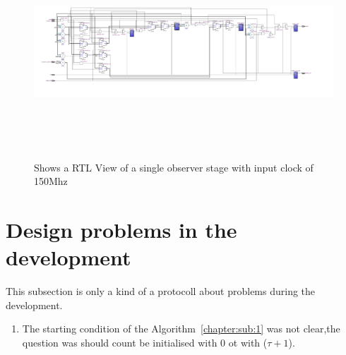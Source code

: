 \begin{figure}[]
\centering
\includegraphics[width=650px,height=300px,angle=-90]{../../pictures/22.02.2014/onlyObserver/OBS_150M.jpg}
\caption[RTL View of Observer 0 with clock 150Mhz]{Shows a RTL View of a single observer stage with input clock of 150Mhz}
\label{fig:test:only:150:obs0}
\end{figure}

\newpage
\section{Design problems in the development}

This subsection is only a kind of a protocoll about problems during the development.
\begin{enumerate}
\item The starting condition of the Algorithm~\ref{chapter:sub:1} was not clear,the question was should 
count be initialised with 0 ot with ($\tau + 1$).
\end{enumerate}
